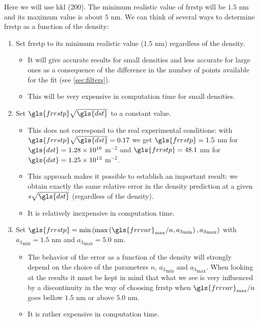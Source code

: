 {\renewcommand{\arraystretch}{1.6}




\bigskip

Here we will use hkl (200).
The minimum realistic value of \gls{frrstp} will be \( 1.5 \) nm and its maximum value is about \( 5 \) nm.
We can think of several ways to determine \gls{frrstp} as a function of the density:
\begin{enumerate}
\item Set \gls{frrstp} to its minimum realistic value (\( 1.5 \) nm) regardless of the density.
\begin{itemize}
\item It will give accurate results for small densities and less accurate for large ones as a consequence of the difference in the number of points available for the fit (see \ref{sec:filters}).
\item This will be very expensive in computation time for small densities.
\end{itemize}
\item Set \( \gls{frrstp} \sqrt{\gls{dst}} \) to a constant value.
\begin{itemize}
\item This does not correspond to the real experimental conditions: with \( \gls{frrstp} \sqrt{\gls{dst}} = 0.17 \) we get \( \gls{frrstp} = 1.5 \) nm for \( \gls{dst} = 1.28 \times 10^{16} \) m\( ^{-2} \) and \( \gls{frrstp} = 48.1 \) nm for \( \gls{dst} = 1.25 \times 10^{13} \) m\( ^{-2} \).
\item This approach makes it possible to establish an important result: we obtain exactly the same relative error in the density prediction at a given \( s \sqrt{\gls{dst}} \) (regardless of the density).
\item It is relatively inexpensive in computation time.
\end{itemize}
\item Set \( \gls{frrstp} = \min \left( \max \left(\gls{frrvar}_{\mathrm{max}}/n, {a_3}_{\mathrm{min}} \right), {a_3}_{\mathrm{max}} \right) \) with \( {a_3}_{\mathrm{min}} = 1.5 \) nm and \( {a_3}_{\mathrm{max}} = 5.0 \) nm.
\begin{itemize}
\item The behavior of the error as a function of the density will strongly depend on the choice of the parameters \( n \), \( {a_3}_{\mathrm{min}} \) and \( {a_3}_{\mathrm{max}} \). When looking at the results it must be kept in mind that what we see is very influenced by a discontinuity in the way of choosing \gls{frrstp} when \( \gls{frrvar}_{\mathrm{max}}/n \) goes bellow \( 1.5 \) nm or above \( 5.0 \) nm.
\item It is rather expensive in computation time.
\end{itemize}
\end{enumerate}

}
